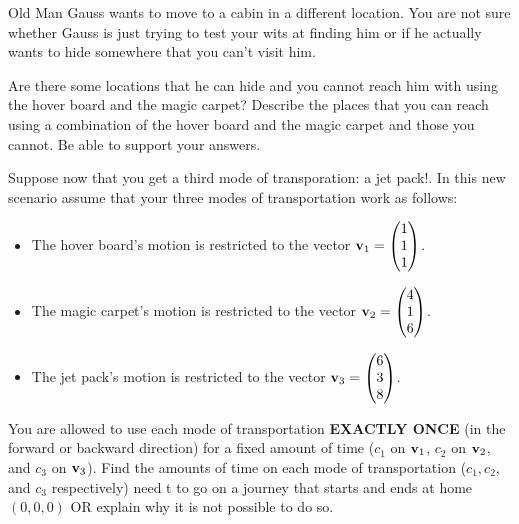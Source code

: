 \begin{problem}
    Old Man Gauss wants to move to a cabin in a different location.  You are not sure
    whether Gauss is just trying to test your wits at finding him or if he actually wants
    to hide somewhere that you can't visit him.  

    Are there some locations that he can hide and you cannot reach him with using the
    hover board and the magic carpet?  Describe the places that you can reach using a
    combination of the hover board and the magic carpet and those you cannot.  Be able to
    support your answers.
\end{problem}

\begin{problem}
    Suppose now that you get a third mode of transporation: a jet pack!.  In this new
    scenario assume that your three modes of transportation work as follows:
    \begin{itemize}
        \item The hover board's motion is restricted to the vector ${\bf v}_1 =
            \begin{pmatrix} 1\\1\\1\end{pmatrix}$.
        \item The magic carpet's motion is restricted to the vector ${\bf v}_2 =
            \begin{pmatrix} 4\\1\\6\end{pmatrix}$.
        \item The jet pack's motion is restricted to the vector ${\bf v}_3 =
            \begin{pmatrix} 6\\3\\8\end{pmatrix}$.
    \end{itemize}
    You are allowed to use each mode of transportation {\bf EXACTLY ONCE} (in the forward or
    backward direction) for a fixed amount of time ($c_1$ on ${\bf v}_1$, $c_2$ on ${\bf v}_2$,
    and $c_3$ on ${\bf v}_3$).  Find the amounts of time on each mode of transportation ($c_1,
    c_2,$ and $c_3$ respectively) need t to go on a journey that starts and ends at home
    $(0,0,0)$ OR explain why it is not possible to do so.
\end{problem}

